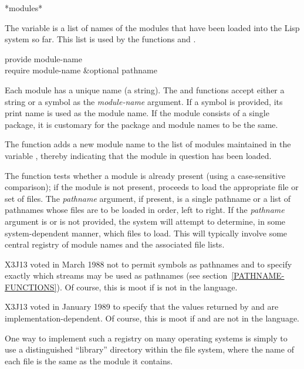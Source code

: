 \begin{defun}[Variable]
*modules*

The variable  is a list of names of the modules
that have been loaded into the Lisp system so far.
This list is used by the functions  and .
\end{defun}

\begin{defun}[Function]
provide module-name \\
require module-name &optional pathname

Each module has a unique name (a string).  The  and 
functions accept either a string or a symbol as the {\it module-name}
argument.  If a symbol is provided, its print name is used as the module
name.  If the module consists of a single package, it is customary for
the package and module names to be the same.

The 
function adds a new module name to the list of modules
maintained in the variable , thereby indicating that
the module in question has been loaded.

The  function tests whether a module is already present
(using a case-sensitive comparison); if the module is not present,
 proceeds to load the appropriate
file or set of files.  The {\it pathname} argument, if present, is a single
pathname or a list of pathnames whose files are to be loaded in order,
left to right.  If the {\it pathname} argument is {\false} or is not provided,
the system will attempt to determine, in some
system-dependent manner, which files to load.
This will typically involve some central
registry of module names and the associated file lists.

\begin{new}
X3J13 voted in March 1988
not to permit symbols as pathnames
 and
to specify exactly which streams may be used as pathnames
 (see section~\ref{PATHNAME-FUNCTIONS}).
Of course, this is moot if  is not in the language.
\end{new}

\begin{new}
X3J13 voted in January 1989
to specify that the values returned by  and 
are implementation-dependent.  Of course, this is moot
if  and  are not in the language.
\end{new}


\beforenoterule
\begin{implementation}
One way to implement such a registry on
many operating systems is simply to use a distinguished ``library''
directory within the file system, where the name of each file
is the same as the module it contains.
\end{implementation}
\afternoterule
\end{defun}

